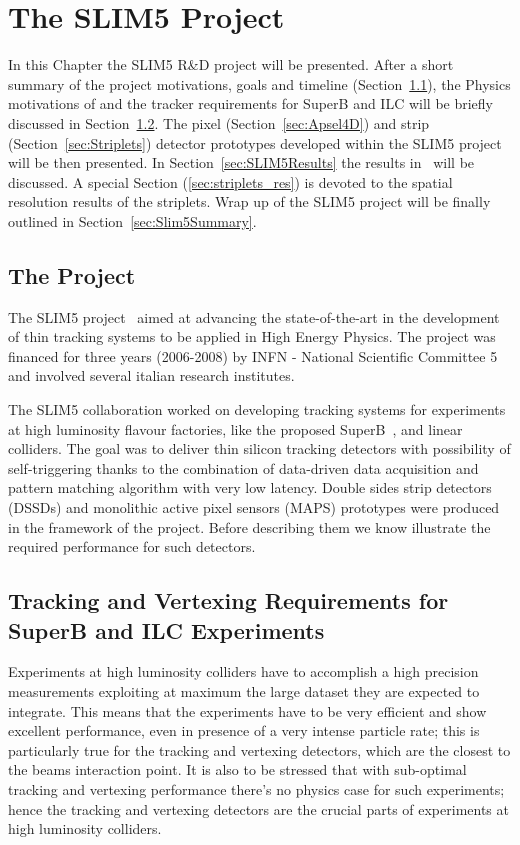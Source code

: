 \chapter{The SLIM5 Project}
\label{chap:SLIM5}
In this Chapter the SLIM5 R\&D project will be presented. After a short summary of the project 
motivations, goals and timeline (Section~\ref{sec:SLIM5Project}), the Physics motivations of 
and the tracker requirements for SuperB and ILC will be briefly discussed in Section~\ref{sec:HLExp}. 
The pixel  (Section~\ref{sec:Apsel4D}) and strip (Section~\ref{sec:Striplets}) 
detector prototypes developed 
within the SLIM5 project will be then presented. In Section~\ref{sec:SLIM5Results} the results 
in~\cite{BETTARINI2010942,BOMBEN2010159,NERI2010195} will be discussed. 
A special Section (\ref{sec:striplets_res}) is devoted to the spatial resolution results of the striplets. 
Wrap up of the SLIM5 project will be finally outlined in Section~\ref{sec:Slim5Summary}.


\section{The Project}
\label{sec:SLIM5Project}
The SLIM5 project~\cite{SLIM5:proj} aimed at advancing the state-of-the-art in the development of thin 
tracking systems to be applied in High Energy Physics. The project was financed for three years
 (2006-2008) by INFN - National Scientific Committee 5~\cite{INFN_V} and involved several 
 italian research institutes. 
 
 The SLIM5 collaboration worked on developing tracking systems for experiments at 
 high luminosity flavour 
 factories, like the proposed SuperB~\cite{Baszczyk:2013xua}, and linear colliders. The goal was to deliver thin silicon tracking detectors with possibility 
 of self-triggering thanks to the combination of data-driven data acquisition and pattern matching 
 algorithm with very low latency. Double sides strip detectors (DSSDs) and monolithic active pixel sensors 
 (MAPS) prototypes were produced in the framework of the project.
Before describing them we know illustrate the required performance for such detectors. 

\section{Tracking and Vertexing Requirements for SuperB and ILC Experiments}
\label{sec:HLExp}
Experiments at high luminosity colliders have to accomplish a high precision measurements 
exploiting at maximum the large dataset they are expected to integrate. 
This means that the experiments have to be very efficient and show excellent performance, 
even in presence of a very intense particle rate; this is particularly true for the tracking and 
vertexing detectors, which are the closest to the beams interaction point. It is also to be stressed 
that with sub-optimal tracking and vertexing performance there's no physics case for such 
experiments; hence the tracking and vertexing detectors are the crucial parts of experiments at 
high luminosity colliders.

